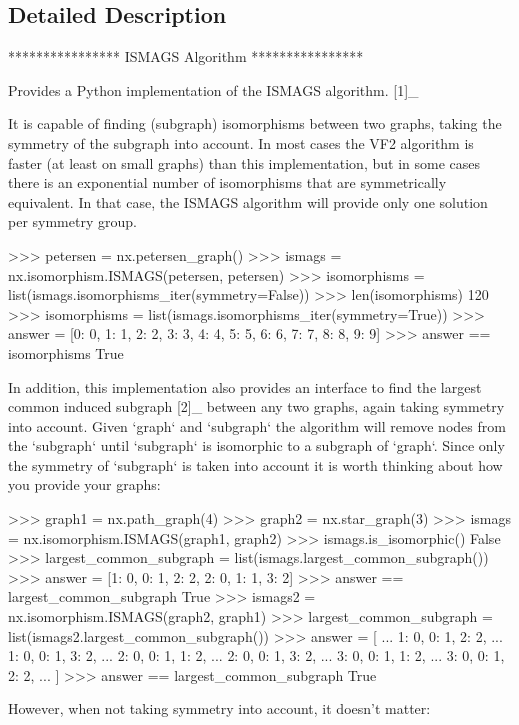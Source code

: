 \subsection{Detailed Description}
\begin{DoxyVerb}****************
ISMAGS Algorithm
****************

Provides a Python implementation of the ISMAGS algorithm. [1]_

It is capable of finding (subgraph) isomorphisms between two graphs, taking the
symmetry of the subgraph into account. In most cases the VF2 algorithm is
faster (at least on small graphs) than this implementation, but in some cases
there is an exponential number of isomorphisms that are symmetrically
equivalent. In that case, the ISMAGS algorithm will provide only one solution
per symmetry group.

>>> petersen = nx.petersen_graph()
>>> ismags = nx.isomorphism.ISMAGS(petersen, petersen)
>>> isomorphisms = list(ismags.isomorphisms_iter(symmetry=False))
>>> len(isomorphisms)
120
>>> isomorphisms = list(ismags.isomorphisms_iter(symmetry=True))
>>> answer = [{0: 0, 1: 1, 2: 2, 3: 3, 4: 4, 5: 5, 6: 6, 7: 7, 8: 8, 9: 9}]
>>> answer == isomorphisms
True

In addition, this implementation also provides an interface to find the
largest common induced subgraph [2]_ between any two graphs, again taking
symmetry into account. Given `graph` and `subgraph` the algorithm will remove
nodes from the `subgraph` until `subgraph` is isomorphic to a subgraph of
`graph`. Since only the symmetry of `subgraph` is taken into account it is
worth thinking about how you provide your graphs:

>>> graph1 = nx.path_graph(4)
>>> graph2 = nx.star_graph(3)
>>> ismags = nx.isomorphism.ISMAGS(graph1, graph2)
>>> ismags.is_isomorphic()
False
>>> largest_common_subgraph = list(ismags.largest_common_subgraph())
>>> answer = [{1: 0, 0: 1, 2: 2}, {2: 0, 1: 1, 3: 2}]
>>> answer == largest_common_subgraph
True
>>> ismags2 = nx.isomorphism.ISMAGS(graph2, graph1)
>>> largest_common_subgraph = list(ismags2.largest_common_subgraph())
>>> answer = [
...     {1: 0, 0: 1, 2: 2},
...     {1: 0, 0: 1, 3: 2},
...     {2: 0, 0: 1, 1: 2},
...     {2: 0, 0: 1, 3: 2},
...     {3: 0, 0: 1, 1: 2},
...     {3: 0, 0: 1, 2: 2},
... ]
>>> answer == largest_common_subgraph
True

However, when not taking symmetry into account, it doesn't matter:


\end{DoxyVerb}
